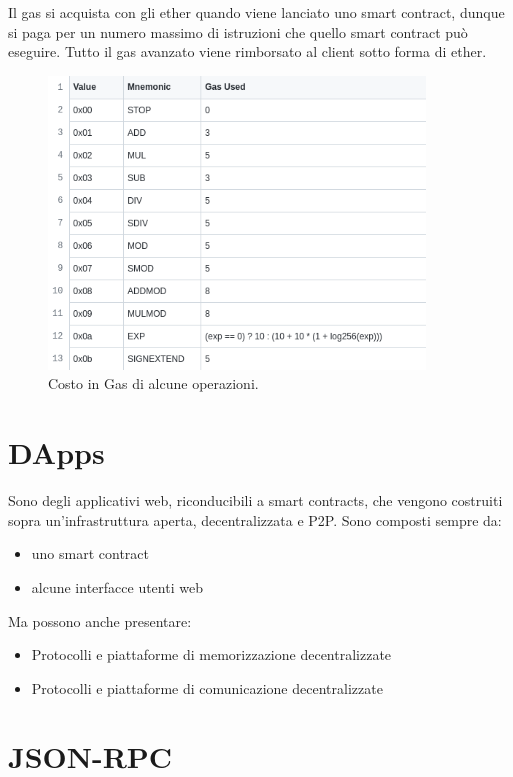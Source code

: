 Il gas si acquista con gli ether quando viene lanciato uno smart contract,
dunque si paga per un numero massimo di istruzioni che quello smart contract può eseguire.
Tutto il gas avanzato viene rimborsato al client sotto forma di ether.

\begin{figure}[H]
      \centering
      \includegraphics[width=10cm, keepaspectratio]{capitoli/ethereum/imgs/costo_gas.png}
      \caption{Costo in Gas di alcune operazioni.}
\end{figure}

\section{DApps}

Sono degli applicativi web, riconducibili a smart contracts, che vengono costruiti sopra
un'infrastruttura aperta, decentralizzata e P2P.
Sono composti sempre da:

\begin{itemize}
      \item uno smart contract
      \item alcune interfacce utenti web
\end{itemize}

Ma possono anche presentare:

\begin{itemize}
      \item Protocolli e piattaforme di memorizzazione decentralizzate
      \item Protocolli e piattaforme di comunicazione decentralizzate
\end{itemize}

\section{JSON-RPC}

